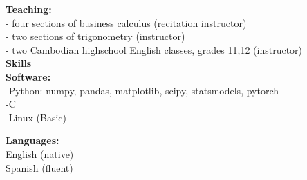 \documentclass[12pt]{amsart}
\newcommand{\n}{\noindent}
\begin{document}
\n \textbf{Teaching:}\\ 
- four sections of business calculus (recitation instructor)\\
- two sections of trigonometry (instructor)\\
- two Cambodian highschool English classes, grades 11,12 (instructor)\\

\smallskip \n \textbf{\large Skills}\vspace{2mm}\\
\n \textbf{Software:}\\
-Python: numpy, pandas, matplotlib, scipy, statsmodels, pytorch\\
-C\\
-Linux (Basic)\vspace{2mm}

\n \textbf{Languages:}\\
English (native)\\
Spanish (fluent)
\end{document}
